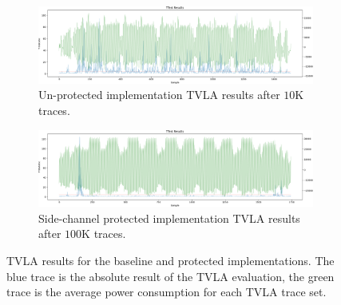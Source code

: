 \begin{figure}
\centering
\begin{subfigure}[t]{0.95\textwidth}
\centering
\includegraphics[width=\textwidth]{graphs/aes-vanilla-enc-default-ttest.png}
\caption{
    Un-protected implementation TVLA results after $10$K traces.
}
\label{fig:sca:unprotected}
\end{subfigure}
\begin{subfigure}[t]{0.95\textwidth}
\centering
\includegraphics[width=\textwidth]{graphs/aes-secure-enc-default-ttest.png}
\caption{
    Side-channel protected implementation TVLA results after $100$K traces.
}
\label{fig:sca:protected}
\end{subfigure}
\caption{
TVLA results for the baseline and protected implementations.
The blue trace is the absolute result of the TVLA evaluation, the green
trace is the average power consumption for each TVLA trace set.
}
\end{figure}
